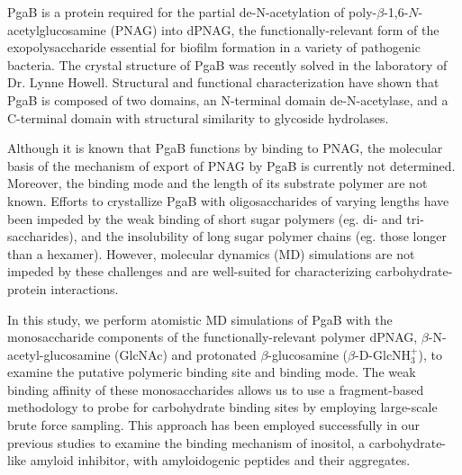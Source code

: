 PgaB is a protein required for the partial de-N-acetylation of poly-$\beta$-1,6-$N$-acetylglucosamine (PNAG) into dPNAG, the functionally-relevant form of the exopolysaccharide essential for biofilm formation in a variety of pathogenic bacteria. \cite{Little:2012dp} The crystal structure of PgaB was recently solved in the laboratory of Dr. Lynne Howell.\cite{Little:2012dp} Structural and functional characterization have shown that PgaB is composed of two domains, an N-terminal domain de-N-acetylase, and a C-terminal domain with structural similarity to glycoside hydrolases.\cite{Little:2012dp}

Although it is known that PgaB functions by binding to PNAG, the molecular basis of the mechanism of export of PNAG by PgaB is currently not determined. Moreover, the binding mode and the length of its substrate polymer are not known.
Efforts to crystallize PgaB with oligosaccharides of varying lengths have been impeded by the weak binding of short sugar polymers (eg. di- and tri-saccharides), and the insolubility of long sugar polymer chains (eg. those longer than a hexamer). However, molecular dynamics (MD) simulations are not impeded by these challenges and are well-suited for characterizing carbohydrate-protein interactions.\cite{Fadda:2010p5889}

In this study, we perform atomistic MD simulations of PgaB with the monosaccharide components of the functionally-relevant polymer dPNAG, $\beta$-N-acetyl-glucosamine (GlcNAc) and protonated $\beta$-glucosamine ($\beta$-D-GlcNH$_{3}^{+}$), to examine the putative polymeric binding site and binding mode. The weak binding affinity of these monosaccharides allows us to use a fragment-based methodology to probe for carbohydrate binding sites by employing large-scale brute force sampling. This approach has been employed successfully in our previous studies to examine the binding mechanism of inositol, a carbohydrate-like amyloid inhibitor, with amyloidogenic peptides and their aggregates.\cite{Li:2012bx, Li:2013fo}

